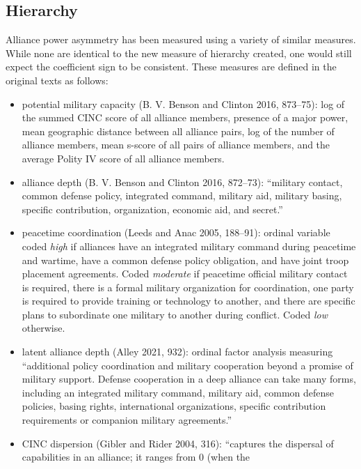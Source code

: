 \documentclass[
  letterpaper,
  DIV=11,
  numbers=noendperiod]{scrartcl}
\begin{document}
\newpage

\subsection{Hierarchy}\label{hierarchy}

Alliance power asymmetry has been measured using a variety of similar
measures. While none are identical to the new measure of hierarchy
created, one would still expect the coefficient sign to be consistent.
These measures are defined in the original texts as follows:

\begin{itemize}
\item
  potential military capacity (B. V. Benson and Clinton 2016, 873--75):
  log of the summed CINC score of all alliance members, presence of a
  major power, mean geographic distance between all alliance pairs, log
  of the number of alliance members, mean s-score of all pairs of
  alliance members, and the average Polity IV score of all alliance
  members.
\item
  alliance depth (B. V. Benson and Clinton 2016, 872--73): ``military
  contact, common defense policy, integrated command, military aid,
  military basing, specific contribution, organization, economic aid,
  and secret.''
\item
  peacetime coordination (Leeds and Anac 2005, 188--91): ordinal
  variable coded \emph{high} if alliances have an integrated military
  command during peacetime and wartime, have a common defense policy
  obligation, and have joint troop placement agreements. Coded
  \emph{moderate} if peacetime official military contact is required,
  there is a formal military organization for coordination, one party is
  required to provide training or technology to another, and there are
  specific plans to subordinate one military to another during conflict.
  Coded \emph{low} otherwise.
\item
  latent alliance depth (Alley 2021, 932): ordinal factor analysis
  measuring ``additional policy coordination and military cooperation
  beyond a promise of military support. Defense cooperation in a deep
  alliance can take many forms, including an integrated military
  command, military aid, common defense policies, basing rights,
  international organizations, specific contribution requirements or
  companion military agreements.''
\item
  CINC dispersion (Gibler and Rider 2004, 316): ``captures the dispersal
  of capabilities in an alliance; it ranges from 0 (when the

\end{itemize}
\end{document}
